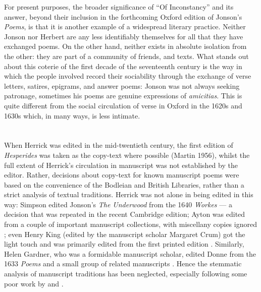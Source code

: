 \begin{paper}
For present purposes, the broader significance of ``Of Inconstancy'' and
its answer, beyond their inclusion in the forthcoming Oxford edition of
Jonson's \emph{Poems}, is that it is another example of a widespread
literary practice. Neither Jonson nor Herbert are any less identifiably
themselves for all that they have exchanged poems. On the other hand,
neither exists in absolute isolation from the other: they are part of a
community of friends, and texts. What stands out about this coterie of
the first decade of the seventeenth century is the way in which the
people involved record their sociability through the exchange of verse
letters, satires, epigrams, and answer poems: Jonson was not always
seeking patronage, sometimes his poems are genuine expressions of
\emph{amicitias}. This is quite different from the social circulation of
verse in Oxford in the 1620s and 1630s which, in many ways, is less
intimate.

\section*{}

When Herrick was edited in the mid-twentieth century, the first edition
of \emph{Hesperides} was taken as the copy-text where possible (Martin
1956), whilst the full extent of Herrick's circulation in manuscript was
not established by the editor. Rather, decisions about copy-text for
known manuscript poems were based on the convenience of the Bodleian and
British Libraries, rather than a strict analysis of textual traditions.
Herrick was not alone in being edited in this way: Simpson edited
Jonson's \emph{The Underwood} from the 1640 \emph{Workes} \citep{herford_ben_1925} --- a decision that was repeated in the recent Cambridge
edition; Ayton was edited from a couple of important manuscript
collections, with miscellany copies ignored \citep{gullans_english_1963}; even Henry
King (edited by the manuscript scholar Margaret Crum) got the light
touch and was primarily edited from the first printed edition \citep{crum_poems_1966}. Similarly, Helen Gardner, who was a formidable manuscript
scholar, edited Donne from the 1633 \emph{Poems} and a small group of
related manuscripts \citep{gardner_elegies_1965,gardner_divine_1978}. Hence the stemmatic analysis
of manuscript traditions has been neglected, especially following some
poor work by \citet{leishman_you_1945} and \citet{wolf_ii_if_1948}.


\end{paper}
